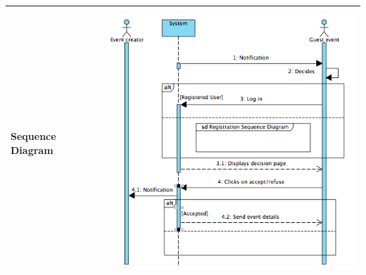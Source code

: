 \documentclass[12pt]{book}
\begin{document}
\begin{center}
\begin{tabular}{ |l|l| }
		Sequence Diagram &  \includegraphics[width=11cm, height=10cm]{newEventRequestSD}\\
		\hline
  		\hline
\end{tabular} \\
\end{center}
\vspace*{\fill}
\end{document}
